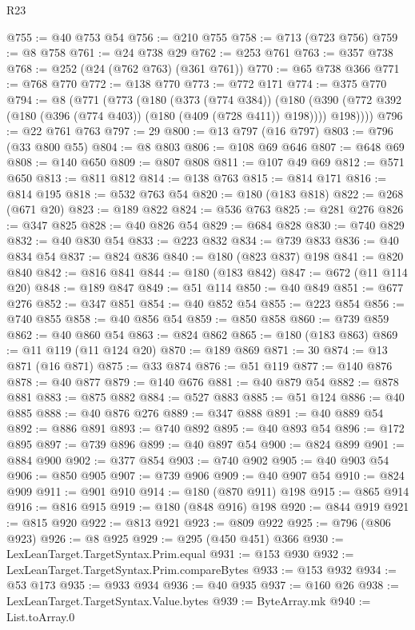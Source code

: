 \begin{lexlean}{R23}
\begin{coremodule}
@755 := @40 @753 @54
@756 := @210 @755
@758 := @713 (@723 @756)
@759 := @8 @758
@761 := @24 @738 @29
@762 := @253 @761
@763 := @357 @738
@768 := @252 (@24 (@762 @763) (@361 @761))
@770 := @65 @738 @366
@771 := @768 @770
@772 := @138 @770
@773 := @772 @171
@774 := @375 @770
@794 := @8
    (@771
      (@773
        (@180
          (@373 (@774 @384))
          (@180 (@390 (@772 @392 (@180 (@396 (@774 @403)) (@180 (@409 (@728 @411)) @198)))) @198))))
@796 := @22 @761 @763
@797 := 29
@800 := @13 @797 (@16 @797)
@803 := @796 (@33 @800 @55)
@804 := @8 @803
@806 := @108 @69 @646
@807 := @648 @69
@808 := @140 @650
@809 := @807 @808
@811 := @107 @49 @69
@812 := @571 @650
@813 := @811 @812
@814 := @138 @763
@815 := @814 @171
@816 := @814 @195
@818 := @532 @763 @54
@820 := @180 (@183 @818)
@822 := @268 (@671 @20)
@823 := @189 @822
@824 := @536 @763
@825 := @281 @276
@826 := @347 @825
@828 := @40 @826 @54
@829 := @684 @828
@830 := @740 @829
@832 := @40 @830 @54
@833 := @223 @832
@834 := @739 @833
@836 := @40 @834 @54
@837 := @824 @836
@840 := @180 (@823 @837) @198
@841 := @820 @840
@842 := @816 @841
@844 := @180 (@183 @842)
@847 := @672 (@11 @114 @20)
@848 := @189 @847
@849 := @51 @114
@850 := @40 @849
@851 := @677 @276
@852 := @347 @851
@854 := @40 @852 @54
@855 := @223 @854
@856 := @740 @855
@858 := @40 @856 @54
@859 := @850 @858
@860 := @739 @859
@862 := @40 @860 @54
@863 := @824 @862
@865 := @180 (@183 @863)
@869 := @11 @119 (@11 @124 @20)
@870 := @189 @869
@871 := 30
@874 := @13 @871 (@16 @871)
@875 := @33 @874
@876 := @51 @119
@877 := @140 @876
@878 := @40 @877
@879 := @140 @676
@881 := @40 @879 @54
@882 := @878 @881
@883 := @875 @882
@884 := @527 @883
@885 := @51 @124
@886 := @40 @885
@888 := @40 @876 @276
@889 := @347 @888
@891 := @40 @889 @54
@892 := @886 @891
@893 := @740 @892
@895 := @40 @893 @54
@896 := @172 @895
@897 := @739 @896
@899 := @40 @897 @54
@900 := @824 @899
@901 := @884 @900
@902 := @377 @854
@903 := @740 @902
@905 := @40 @903 @54
@906 := @850 @905
@907 := @739 @906
@909 := @40 @907 @54
@910 := @824 @909
@911 := @901 @910
@914 := @180 (@870 @911) @198
@915 := @865 @914
@916 := @816 @915
@919 := @180 (@848 @916) @198
@920 := @844 @919
@921 := @815 @920
@922 := @813 @921
@923 := @809 @922
@925 := @796 (@806 @923)
@926 := @8 @925
@929 := @295 (@450 @451) @366
@930 := LexLeanTarget.TargetSyntax.Prim.equal
@931 := @153 @930
@932 := LexLeanTarget.TargetSyntax.Prim.compareBytes
@933 := @153 @932
@934 := @53 @173
@935 := @933 @934
@936 := @40 @935
@937 := @160 @26
@938 := LexLeanTarget.TargetSyntax.Value.bytes
@939 := ByteArray.mk
@940 := List.toArray.{0}

\end{coremodule}
\end{lexlean}
